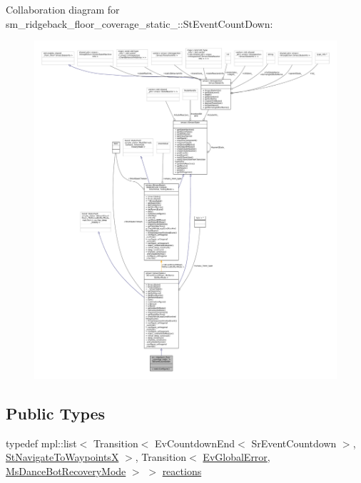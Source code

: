 Collaboration diagram for sm\+\_\+ridgeback\+\_\+floor\+\_\+coverage\+\_\+static\+\_\+:\+:St\+Event\+Count\+Down\+:
\nopagebreak
\begin{figure}[H]
\begin{center}
\leavevmode
\includegraphics[width=350pt]{structsm__ridgeback__floor__coverage__static__1_1_1StEventCountDown__coll__graph}
\end{center}
\end{figure}
\subsection*{Public Types}
\begin{DoxyCompactItemize}
\item 
typedef mpl\+::list$<$ Transition$<$ Ev\+Countdown\+End$<$ Sr\+Event\+Countdown $>$, \hyperlink{structsm__ridgeback__floor__coverage__static__1_1_1StNavigateToWaypointsX}{St\+Navigate\+To\+WaypointsX} $>$, Transition$<$ \hyperlink{structsm__ridgeback__floor__coverage__static__1_1_1EvGlobalError}{Ev\+Global\+Error}, \hyperlink{classsm__ridgeback__floor__coverage__static__1_1_1MsDanceBotRecoveryMode}{Ms\+Dance\+Bot\+Recovery\+Mode} $>$ $>$ \hyperlink{structsm__ridgeback__floor__coverage__static__1_1_1StEventCountDown_a8a50d333167a3f6846dde61cda0d0b43}{reactions}
\end{DoxyCompactItemize}
